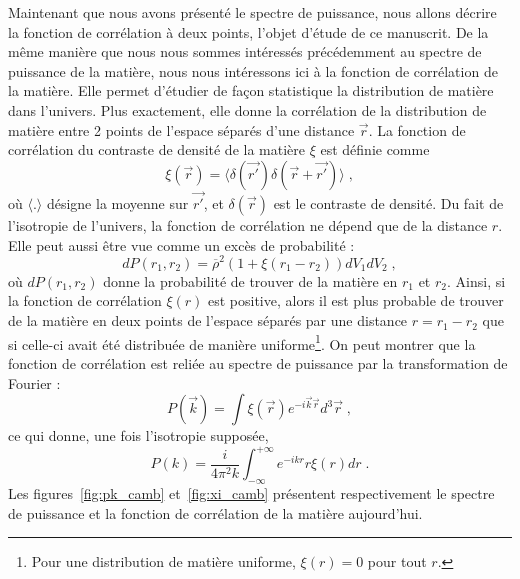 \documentclass[11pt, twoside, a4paper, openright]{report}
\begin{document}
Maintenant que nous avons présenté le spectre de puissance, nous allons décrire la fonction de corrélation à deux points, l'objet d'étude de ce manuscrit. De la même manière que nous nous sommes intéressés précédemment au spectre de puissance de la matière, nous nous intéressons ici à la fonction de corrélation de la matière. Elle permet d'étudier de façon statistique la distribution de matière dans l'univers. Plus exactement, elle donne la corrélation de la distribution de matière entre 2 points de l'espace séparés d'une distance $\vec r$. La fonction de corrélation du contraste de densité de la matière $\xi$ est définie comme
\begin{equation}
  \label{eq:def_cf}
  \xi(\vec r) = \langle \delta(\vec{r'}) \delta(\vec{r} + \vec{r'}) \rangle \; ,
\end{equation}
où $\langle.\rangle$ désigne la moyenne sur $\vec{r'}$, et $\delta(\vec{r})$ est le contraste de densité.
Du fait de l'isotropie de l'univers, la fonction de corrélation ne dépend que de la distance $r$.
Elle peut aussi être vue comme un excès de probabilité :
\begin{equation}
  \label{eq:def_cf2}
  dP(r_{1}, r_{2}) = \overline \rho^{2} ( 1 + \xi(r_{1} - r_{2})) dV_{1} dV_{2}  \; ,
\end{equation}
où $dP(r_{1}, r_{2})$ donne la probabilité de trouver de la matière en $r_{1}$ et $r_{2}$.
Ainsi, si la fonction de corrélation $\xi(r)$ est positive, alors il est plus probable de trouver de la matière en deux points de l'espace séparés par une distance $r = r_{1} - r_{2}$ que si celle-ci avait été distribuée de manière uniforme\footnote{Pour une distribution de matière uniforme, $\xi(r) = 0$ pour tout $r$.}.
On peut montrer que la fonction de corrélation est reliée au spectre de puissance par la transformation de Fourier :
\begin{equation}
  \label{eq:cf_tf}
  P(\vec{k}) = \int \xi(\vec{r}) e^{- i \vec{k} \vec{r}} d^3\vec{r}  \; ,
\end{equation}
ce qui donne, une fois l'isotropie supposée,
\begin{equation}
  \label{eq:cf_tf2}
  P(k) = \frac{i}{4 \pi^2 k} \int_{-\infty}^{+\infty} e^{- i k r} r \xi(r) dr  \; .
\end{equation}
Les figures~\ref{fig:pk_camb} et~\ref{fig:xi_camb} présentent respectivement le spectre de puissance et la fonction de corrélation de la matière aujourd'hui.
\end{document}
